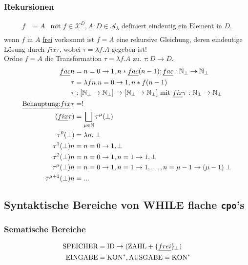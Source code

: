 \subsubsection{Rekursionen}
\begin{align*}
f &= A &\text{mit } f \in \mathcal{X}^D, A:D \in \mathcal{A}_\lambda \text{ definiert eindeutig ein Element in } D.\\
\end{align*}
wenn $f$ in $A$ \underline{frei} vorkommt ist $f=A$ eine rekursive Gleichung, deren eindeutige Lösung durch $ \underline{fix} \tau $, wobei $ \tau = \lambda f.A$ gegeben ist!\\
Ordne $f=A$ die Transformation  $\tau = \lambda f.A$ zu. $\tau : D \rightarrow D$.\\
\begin{align*}
\underline{fac} n &= n = 0 \rightarrow 1, n * \underline{fac} (n-1); \underline{fac}: \mathbb{N}_\perp \rightarrow \mathbb{N}_\perp\\
\tau &= \lambda f n . n = 0 \rightarrow 1, n * f (n-1) \\
\tau &: [\mathbb{N}_\perp \rightarrow \mathbb{N}_\perp] \rightarrow [\mathbb{N}_\perp \rightarrow \mathbb{N}_\perp] \text{ mit } \underline{fix} \tau : \mathbb{N}_\perp \rightarrow \mathbb{N}_\perp\\
\text{\underline{Behauptung:}} \underline{fix} \tau &= !\\
(\underline{fix} \tau) &= \bigsqcup_{\mu \in \mathbb{N}} \tau^\mu (\perp)\\
\tau^0 (\perp) &= \lambda n.\perp \\
\tau^1 (\perp) n &= n = 0 \rightarrow 1, \perp \\
\tau^2 (\perp) n &= n = 0 \rightarrow 1, n = 1 \rightarrow 1, \perp \\
\tau^\mu (\perp) n &= n = 0 \rightarrow 1, n = 1 \rightarrow 1, \dots, n = \mu -1 \rightarrow (\mu -1)\perp \\
\tau^{\mu + 1} (\perp) n &= ... \\
\end{align*}

\subsection{Syntaktische Bereiche von WHILE flache \lstinline!cpo!'s}
\subsubsection{Sematische Bereiche}
\begin{align*}
\text{\lstinline!SPEICHER!} &= \text{\lstinline!ID!} \rightarrow (\text{\lstinline!ZAHL!} + \{\underline{frei}\}_\perp)\\
\text{\lstinline!EINGABE!} &= \text{\lstinline!KON!}^*,\text{\lstinline!AUSGABE!} = \text{\lstinline!KON!}^*\\
\end{align*}
